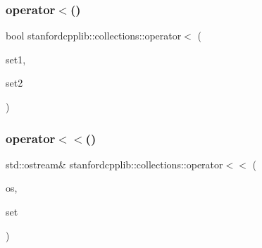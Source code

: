 \mbox{\label{namespacestanfordcpplib_1_1collections_aa3ea03887fa8c5a8c9e91a68907bf625}} 
\subsubsection{\texorpdfstring{operator$<$()}{operator<()}}
{\footnotesize\ttfamily bool stanfordcpplib\+::collections\+::operator$<$ (\begin{DoxyParamCaption}\item[{const \mbox{\hyperlink{classstanfordcpplib_1_1collections_1_1GenericSet}{Generic\+Set}}$<$ \mbox{\hyperlink{structstanfordcpplib_1_1collections_1_1SetTraits}{Set\+Traits}} $>$ \&}]{set1,  }\item[{const \mbox{\hyperlink{classstanfordcpplib_1_1collections_1_1GenericSet}{Generic\+Set}}$<$ \mbox{\hyperlink{structstanfordcpplib_1_1collections_1_1SetTraits}{Set\+Traits}} $>$ \&}]{set2 }\end{DoxyParamCaption})}

\mbox{\label{namespacestanfordcpplib_1_1collections_aff90d5798e037c8e932e2dce26e6983a}} 
\subsubsection{\texorpdfstring{operator$<$$<$()}{operator<<()}}
{\footnotesize\ttfamily std\+::ostream\& stanfordcpplib\+::collections\+::operator$<$$<$ (\begin{DoxyParamCaption}\item[{std\+::ostream \&}]{os,  }\item[{const \mbox{\hyperlink{classstanfordcpplib_1_1collections_1_1GenericSet}{Generic\+Set}}$<$ \mbox{\hyperlink{structstanfordcpplib_1_1collections_1_1SetTraits}{Set\+Traits}} $>$ \&}]{set }\end{DoxyParamCaption})}

\mbox{\label{namespacestanfordcpplib_1_1collections_a90953b7174c06404b549bb12c3945df3}} 
